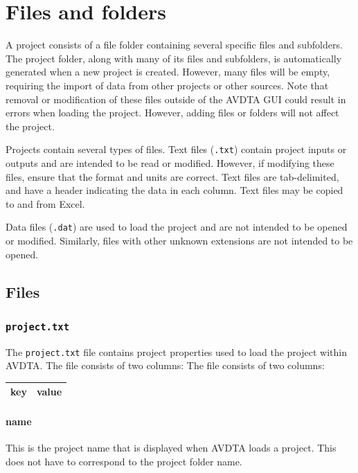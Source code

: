 \section{Files and folders}

A project consists of a file folder containing several specific files and subfolders. The project folder, along with many of its files and subfolders, is automatically generated when a new project is created. However, many files will be empty, requiring the import of data from other projects or other sources. Note that removal or modification of these files outside of the AVDTA GUI could result in errors when loading the project. However, adding files or folders will not affect the project. 

Projects contain several types of files. Text files (\texttt{.txt}) contain project inputs or outputs and are intended to be read or modified. However, if modifying these files, ensure that the format and units are correct. Text files are tab-delimited, and have a header indicating the data in each column. Text files may be copied to and from Excel.

Data files (\texttt{.dat}) are used to load the project and are not intended to be opened or modified. Similarly, files with other unknown extensions are not intended to be opened.

\subsection{Files}

\subsubsection{\texttt{project.txt}}
The \texttt{project.txt} file contains project properties used to load the project within AVDTA. The file consists of two columns:
 The file consists of two columns:
\begin{center}
\begin{tabular}{cc}
\hline
key & value\\\hline
\end{tabular}
\end{center}


\paragraph*{name}
This is the project name that is displayed when AVDTA loads a project. This does not have to correspond to the project folder name.

